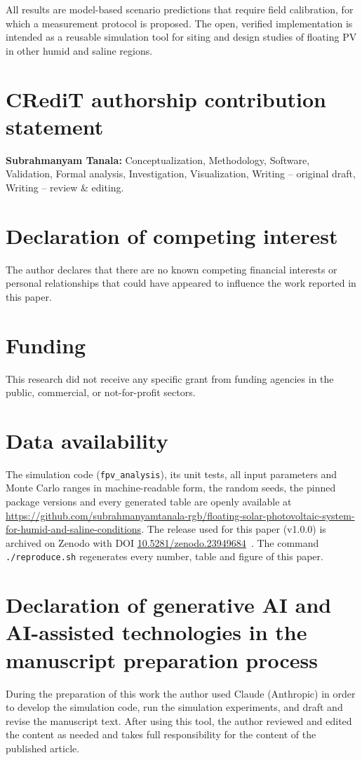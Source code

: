 \documentclass[preprint,11pt]{elsarticle}
\begin{document}
All results are model-based scenario predictions that require field calibration, for which a measurement protocol is
proposed. The open, verified implementation is intended as a reusable simulation tool for siting and design studies of
floating PV in other humid and saline regions.

\section*{CRediT authorship contribution statement}
\textbf{Subrahmanyam Tanala:} Conceptualization, Methodology, Software, Validation, Formal analysis, Investigation,
Visualization, Writing -- original draft, Writing -- review \& editing.

\section*{Declaration of competing interest}
The author declares that there are no known competing financial interests or personal relationships that could have
appeared to influence the work reported in this paper.

\section*{Funding}
This research did not receive any specific grant from funding agencies in the public, commercial, or not-for-profit
sectors.

\section*{Data availability}
The simulation code (\texttt{fpv\_analysis}), its unit tests, all input parameters and Monte Carlo ranges in
machine-readable form, the random seeds, the pinned package versions and every generated table are openly available at
\url{https://github.com/subrahmanyamtanala-rgb/floating-solar-photovoltaic-system-for-humid-and-saline-conditions}. The
release used for this paper (v1.0.0) is archived on Zenodo with DOI
\href{https://doi.org/10.5281/zenodo.23949684}{10.5281/zenodo.23949684}~\cite{tanala2026fpv}. The command \texttt{./reproduce.sh} regenerates every number, table and figure of this paper.

\section*{Declaration of generative AI and AI-assisted technologies in the manuscript preparation process}
During the preparation of this work the author used Claude (Anthropic) in order to develop the simulation code, run the
simulation experiments, and draft and revise the manuscript text. After using this tool, the author reviewed and edited
the content as needed and takes full responsibility for the content of the published article.
\end{document}
